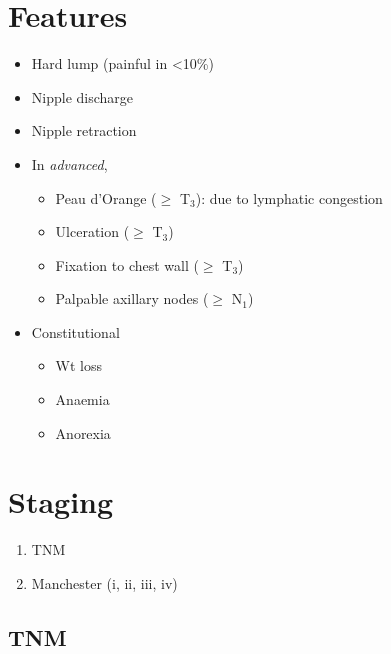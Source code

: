 \documentclass[
  12pt,
]{memoir}
\providecommand{\tightlist}{%
  \setlength{\itemsep}{0pt}\setlength{\parskip}{0pt}}
\begin{document}
\hypertarget{features-2}{%
\section{Features}\label{features-2}}

\begin{itemize}
\tightlist
\item
  Hard lump (painful in \textless10\%)
\item
  Nipple discharge
\item
  Nipple retraction
\item
  In \emph{advanced},

  \begin{itemize}
  \tightlist
  \item
    Peau d'Orange (\(\ge\) T\(_3\)): due to lymphatic congestion
  \item
    Ulceration (\(\ge\) T\(_3\))
  \item
    Fixation to chest wall (\(\ge\) T\(_3\))
  \item
    Palpable axillary nodes (\(\ge\) N\(_1\))
  \end{itemize}
\item
  Constitutional

  \begin{itemize}
  \tightlist
  \item
    Wt loss
  \item
    Anaemia
  \item
    Anorexia
  \end{itemize}
\end{itemize}

\hypertarget{staging-1}{%
\section{Staging}\label{staging-1}}

\begin{enumerate}
\def\labelenumi{\arabic{enumi}.}
\tightlist
\item
  TNM
\item
  Manchester (i, ii, iii, iv)
\end{enumerate}

\hypertarget{tnm}{%
\subsection{TNM}\label{tnm}}
\end{document}
